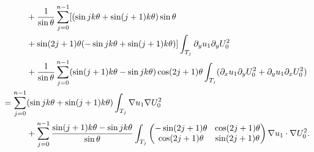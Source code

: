 \documentclass[JEP,XML,SOM,Unicode,ThmDefs,NoFloatCountersInSection,published]{cedram}
\newcommand{\colsep}{\arraycolsep4.5pt}
\theoremstyle{plain}
\theoremstyle{definition}
\begin{document}
\begin{align*}
&\hspace*{1cm}+ \frac{1}{\sin \theta}\sum_{j=0}^{n-1}[ (\sin jk\theta + \sin(j+1)k\theta)\sin \theta\\
&\hspace*{1cm}+ \sin (2j+1)\theta (-\sin jk\theta +\sin(j+1)k\theta) ]\int_{T_j} \partial_y u_1 \partial_y U_0^2\\
&\hspace*{1cm}+\frac{1}{\sin \theta}\sum_{j=0}^{n-1} (\sin(j+1)k\theta-\sin jk\theta)\cos(2j+1)\theta
\int_{T_j} (\partial_x u_1 \partial_y U_0^2 + \partial_y u_1 \partial_x U_0^2)\\
&= \sum_{j=0}^{n-1}(\sin jk\theta + \sin(j+1)k\theta) \int_{T_j} \nabla u_1 \nabla U_0^2\\
&\hspace*{1cm}+ \sum_{j=0}^{n-1}\dfrac{\sin(j+1)k\theta-\sin jk\theta}{\sin \theta} \int _{T_j}\colsep \begin{pmatrix}
-\sin (2j+1)\theta & \cos (2j+1) \theta \\
\cos (2j+1)\theta & \sin (2j+1)\theta
\end{pmatrix}\nabla u_1 \cdot \nabla U_0^2.
\end{align*}
\egroup\newpage

\backmatter


\end{document}
